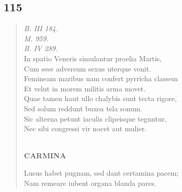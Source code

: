 \documentclass[11pt, a4paper]{report}
\begin{document}
            \subsection*{115}
      \begin{verse}
      \textit{B. III 184.} \\ \textit{M. 959.} \\ \textit{B. IV 289.} \\ In spatio Veneris simulantur proelia Martis, \\ Cum sese adversum sexus uterque venit. \\ Femineam maribus nam confert pyrricha classem \\ Et velut in morem militis arma movet. \\ Quae tamen haut ullo chalybis sunt tecta rigore, \\ Sed solum reddunt buxea tela sonum. \\ Sic alterna petunt iaculis clipeisque teguntur, \\ Nec sibi congressi vir nocet aut mulier. \\ 
        ﻿\pagebreak 
     \marginpar{[10]} \begin{center} \textbf{CARMINA} \end{center}Lusus habet pugnam, sed dant certamina pacem; \\ Nam remeare iubent organa blanda pares. \\ 
      \end{verse}
  
\end{document}
